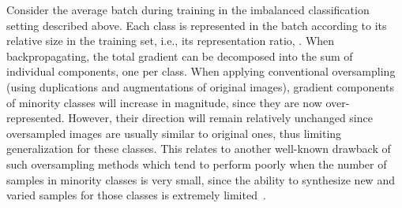 \documentclass[nohyperref]{article}
\theoremstyle{plain}
\theoremstyle{definition}
\theoremstyle{remark}
\begin{document}
Consider the average batch during training in the imbalanced classification setting described above. Each class is represented in the batch according to its relative size in the training set, i.e., its representation ratio, . When backpropagating, the total gradient can be decomposed into the sum of  individual components, one per class. When applying conventional oversampling (using duplications and augmentations of original images), gradient components of minority classes will increase in magnitude, since they are now over-represented. However, their direction will remain relatively unchanged since oversampled images are usually similar to original ones, thus limiting generalization for these classes. This relates to another well-known drawback of such oversampling methods which tend to perform poorly when the number of samples in minority classes is very small, since the ability to synthesize new and varied samples for those classes is extremely limited~\cite{kim2020m2m}.
\end{document}
